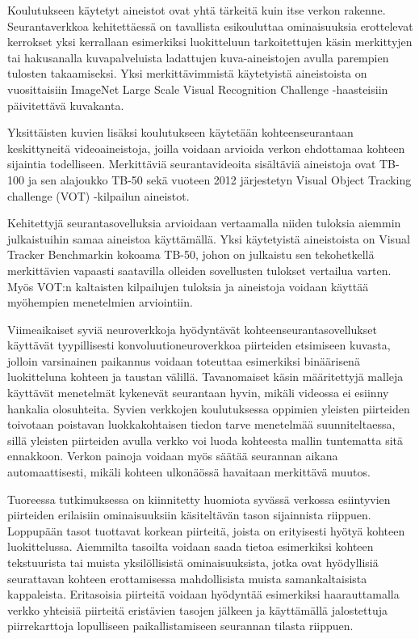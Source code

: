 Koulutukseen käytetyt aineistot ovat yhtä tärkeitä kuin itse verkon rakenne. Seurantaverkkoa
kehitettäessä on tavallista esikouluttaa ominaisuuksia erottelevat kerrokset yksi kerrallaan
esimerkiksi luokitteluun tarkoitettujen käsin merkittyjen tai hakusanalla kuvapalveluista
ladattujen kuva-aineistojen avulla parempien tulosten takaamiseksi. Yksi merkittävimmistä
käytetyistä aineistoista on vuosittaisiin ImageNet Large Scale Visual Recognition Challenge
-haasteisiin päivitettävä kuvakanta.

Yksittäisten kuvien lisäksi koulutukseen käytetään kohteenseurantaan keskittyneitä
videoaineistoja, joilla voidaan arvioida verkon ehdottamaa kohteen sijaintia todelliseen.
Merkittäviä seurantavideoita sisältäviä aineistoja ovat TB-100 ja sen alajoukko TB-50 sekä
vuoteen 2012 järjestetyn Visual Object Tracking challenge (VOT) -kilpailun aineistot.

Kehitettyjä seurantasovelluksia arvioidaan vertaamalla niiden tuloksia aiemmin julkaistuihin
samaa aineistoa käyttämällä. Yksi käytetyistä aineistoista on Visual Tracker Benchmarkin kokoama
TB-50, johon on julkaistu sen tekohetkellä merkittävien vapaasti saatavilla olleiden sovellusten
tulokset vertailua varten. Myös VOT:n kaltaisten kilpailujen tuloksia ja aineistoja voidaan
käyttää myöhempien menetelmien arviointiin.

Viimeaikaiset syviä neuroverkkoja hyödyntävät kohteenseurantasovellukset käyttävät
tyypillisesti konvoluutioneuroverkkoa piirteiden etsimiseen kuvasta, jolloin varsinainen
paikannus voidaan toteuttaa esimerkiksi binäärisenä luokitteluna kohteen ja taustan
välillä. Tavanomaiset käsin määritettyjä malleja käyttävät menetelmät kykenevät seurantaan
hyvin, mikäli videossa ei esiinny hankalia olosuhteita. Syvien verkkojen koulutuksessa
oppimien yleisten piirteiden toivotaan poistavan luokkakohtaisen tiedon tarve menetelmää
suunniteltaessa, sillä yleisten piirteiden avulla verkko voi luoda kohteesta mallin
tuntematta sitä ennakkoon. Verkon painoja voidaan myös säätää seurannan aikana automaattisesti,
mikäli kohteen ulkonäössä havaitaan merkittävä muutos.

Tuoreessa tutkimuksessa on kiinnitetty huomiota syvässä verkossa esiintyvien piirteiden
erilaisiin ominaisuuksiin käsiteltävän tason sijainnista riippuen. Loppupään tasot
tuottavat korkean piirteitä, joista on erityisesti hyötyä kohteen luokittelussa. Aiemmilta
tasoilta voidaan saada tietoa esimerkiksi kohteen tekstuurista tai muista yksilöllisistä
ominaisuuksista, jotka ovat hyödyllisiä seurattavan kohteen erottamisessa mahdollisista
muista samankaltaisista kappaleista. Eritasoisia piirteitä voidaan hyödyntää esimerkiksi
haarauttamalla verkko yhteisiä piirteitä eristävien tasojen jälkeen ja käyttämällä
jalostettuja piirrekarttoja lopulliseen paikallistamiseen seurannan tilasta riippuen.

